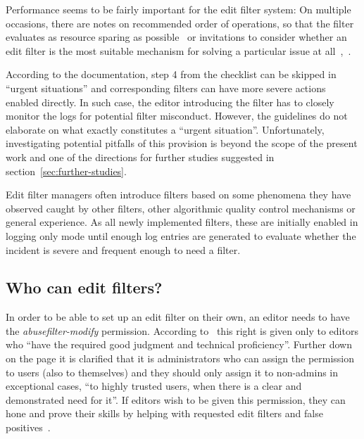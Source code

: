 Performance seems to be fairly important for the edit filter system:
On multiple occasions, there are notes on recommended order of operations, so that the filter evaluates as resource sparing as possible~\cite{Wikipedia:EditFilterInstructions} or invitations to consider whether an edit filter is the most suitable mechanism for solving a particular issue at all~\cite{Wikipedia:EditFilter},~\cite{Wikipedia:EditFilterRequested}.

According to the documentation, step 4 from the checklist can be skipped in ``urgent situations'' and corresponding filters can have more severe actions enabled directly. %
In such case, the editor introducing the filter has to closely monitor the logs for potential filter misconduct.
However, the guidelines do not elaborate on what exactly constitutes a ``urgent situation''.
Unfortunately, investigating potential pitfalls of this provision is beyond the scope of the present work and one of the directions for further studies suggested in section~\ref{sec:further-studies}.

Edit filter managers often introduce filters based on some phenomena they have observed caught by other filters, other algorithmic quality control mechanisms or general experience.
As all newly implemented filters, these are initially enabled in logging only mode until enough log entries are generated to evaluate whether the incident is severe and frequent enough to need a filter.


\subsection{Who can edit filters?}
\label{section:who-can-edit}

In order to be able to set up an edit filter on their own, an editor needs to have the \emph{abusefilter-modify} permission.
According to~\cite{Wikipedia:EditFilter} this right is given only to editors who ``have the required good judgment and technical proficiency''.
Further down on the page it is clarified that it is administrators who can assign the permission to users (also to themselves) and they should only assign it to non-admins in exceptional cases, ``to highly trusted users, when there is a clear and demonstrated need for it''.
If editors wish to be given this permission, they can hone and prove their skills by helping with requested edit filters and false positives~\cite{Wikipedia:EditFilter}.

